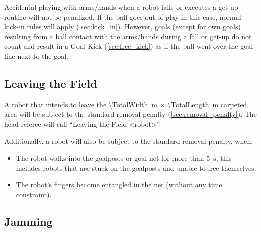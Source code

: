 Accidental playing with arms/hands when a robot falls or executes a get-up routine will not be penalized.
If the ball goes out of play in this case, normal kick-in rules will apply (\cf \cref{sec:kick_in}).
However, goals (except for own goals) resulting from a ball contact with the arms/hands during a fall or get-up do not count and result in a Goal Kick (\cf \cref{sec:free_kick}) as if the ball went over the goal line next to the goal.

\subsection{Leaving the Field}
\label{sec:leaving_field}

A robot that intends to leave the \qty{\TotalWidth}{\metre} $\times$ \qty{\TotalLength}{\metre} carpeted area will be subject to the standard removal penalty (\cf \cref{sec:removal_penalty}).
The head referee will call ``Leaving the Field \textless robot\textgreater''.

Additionally, a robot will also be subject to the standard removal penalty, when:
\begin{itemize}
  \item The robot walks into the goalposts or goal net for more than \qty{5}{\second}, this includes robots that are stuck on the goalposts and unable to free themselves.
  \item The robot's fingers become entangled in the net (without any time constraint).
\end{itemize}

\subsection{Jamming}
\label{sec:jamming}

